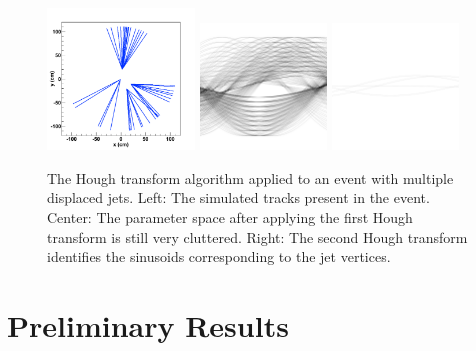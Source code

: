 \documentclass[preprint,sort&compress]{elsarticle}
\begin{document}
\begin{figure}[!Hhtb]
\begin{center}
	\includegraphics[width=0.35\textwidth]{tracks.pdf}
	\includegraphics[width=0.30\textwidth]{accumulator.pdf}
	\includegraphics[width=0.30\textwidth]{vertex.pdf}
	\caption{The Hough transform algorithm applied to an event with multiple displaced jets. Left: The simulated
	tracks present in the event. Center: The parameter space after applying the first Hough transform is still very
	cluttered. Right: The second Hough transform identifies the sinusoids corresponding to the jet vertices.
	\label{fig:DisplacedJets}}
\end{center}
\end{figure}

\section{Preliminary Results}
\end{document}
